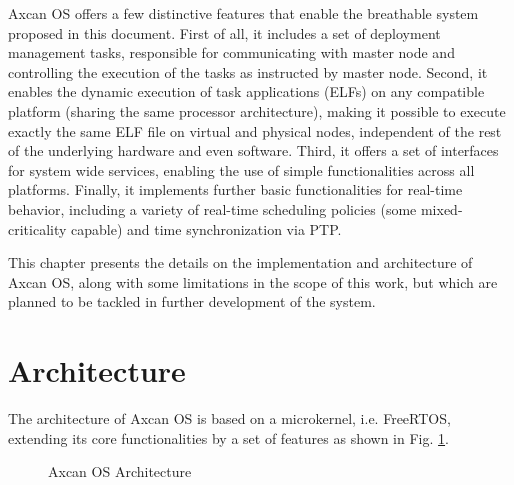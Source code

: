 Axcan OS offers a few distinctive features that enable the breathable system proposed in this document. First of all, it includes a set of deployment management tasks, responsible for communicating with master node and controlling the execution of the tasks as instructed by master node. Second, it enables the dynamic execution of task applications (ELFs) on any compatible platform (sharing the same processor architecture), making it possible to execute exactly the same ELF file on virtual and physical nodes, independent of the rest of the underlying hardware and even software. Third, it offers a set of interfaces for system wide services, enabling the use of simple functionalities across all platforms. Finally, it implements further basic functionalities for real-time behavior, including a variety of real-time scheduling policies (some mixed-criticality capable) and time synchronization via PTP.

This chapter presents the details on the implementation and architecture of Axcan OS, along with some limitations in the scope of this work, but which are planned to be tackled in further development of the system.

\section{Architecture}
The architecture of Axcan OS is based on a microkernel, i.e. FreeRTOS, extending its core functionalities by a set of features as shown in Fig. \ref{fig:os_arch}.

\begin{figure}
	\centering
	
	\caption{Axcan OS Architecture}
	\label{fig:os_arch}
\end{figure}

